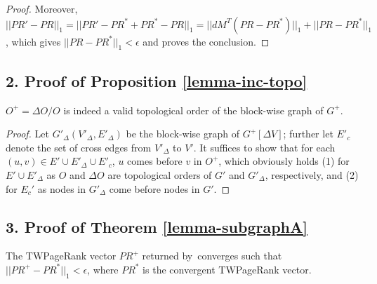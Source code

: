 \begin{proof}
Moreover, $||PR'-PR||_1 = ||PR' - PR^* + PR^* -PR||_1 = ||d M^T (PR-PR^*)||_1 + ||PR-PR^*||_1$, which gives $||PR-PR^*||_1<\epsilon$ and proves the conclusion.
\end{proof}

\subsection*{2. Proof of Proposition \ref{lemma-inc-topo}}
$O^+=\Delta O/O$ is indeed a valid topological order of the block-wise graph of $G^+$.

\begin{proof}
Let $G'_\Delta(V'_\Delta, E'_\Delta)$ be the block-wise graph of $G^+[\Delta V]$; further let $E'_c$ denote the set of cross edges from $V'_\Delta$ to $V'$.
It suffices to show that for each $(u,v)\in E'\cup E'_\Delta \cup E'_c$, $u$ comes before $v$ in $O^+$,
which obviously holds (1) for  $E'\cup E'_\Delta$ as $O$ and $\Delta O$ are topological orders of $G'$ and $G'_\Delta$, respectively, and (2) for $E_{c}'$ as nodes in $G'_\Delta$ come before nodes in $G'$.
\end{proof}



\subsection*{3. Proof of Theorem \ref{lemma-subgraphA}}
The TWPageRank vector $PR^+$ returned by~\inctwprscc converges such that $||PR^+-PR^{*}||_1 < \epsilon$, where $PR^{*}$ is the convergent TWPageRank vector.

